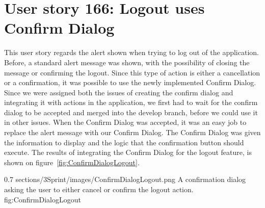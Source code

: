 \section{User story 166: Logout uses Confirm Dialog}
This user story regards the alert shown when trying to log out of the application. Before, a standard alert message was shown, with the possibility of closing the message or confirming the logout. 
Since this type of action is either a cancellation or a confirmation, it was possible to use the newly implemented Confirm Dialog. Since we were assigned both the issues of creating the confirm dialog and integrating it with actions in the application, we first had to wait for the confirm dialog to be accepted and merged into the develop branch, before we could use it in other issues. 
When the Confirm Dialog was accepted, it was an easy job to replace the alert message with our Confirm Dialog. The Confirm Dialog was given the information to display and the logic that the confirmation button should execute. 
The results of integrating the Confirm Dialog for the logout feature, is shown on figure~\ref{fig:ConfirmDialogLogout}.


        {0.7} %
        {sections/3Sprint/images/ConfirmDialogLogout.png} %
        {A confirmation dialog asking the user to either cancel or confirm the logout action.} %
        {fig:ConfirmDialogLogout} %